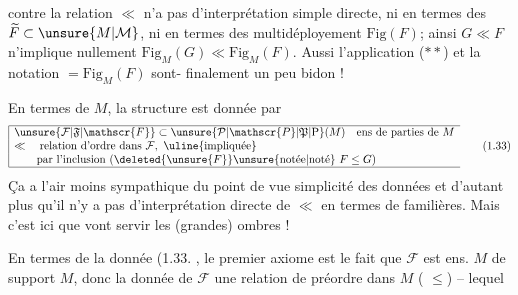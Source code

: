  contre la relation $\ll$ n'a pas d'interprétation simple directe, ni en termes des  $\widetilde F\subset\unsure{M|\mathcal{M}}$, ni en termes des multidéployement $\mathrm{Fig}(F)$; ainsi $G\ll F$ n'implique nullement $\mathrm{Fig}_{M}(G)\ll\mathrm{Fig}_{M}(F)$. Aussi l'application ($**$) et la notation $=\mathrm{Fig}_{M}(F)$ sont- finalement un peu bidon !

En termes de $M$, la structure est donnée par
\[
\begin{array}{|l}\hline
\unsure{\mathcal{F}|\mathfrak{F}|\mathscr{F}}\subset\unsure{\mathcal{P}|\mathscr{P}|\mathfrak{P}|\mathrm{P}}(M)\quad\text{ens de parties de }M\\
\ll\quad\text{relation d'ordre dans }\mathcal{F},\ \text{\uline{impliquée}}\\
\qquad\text{par l'inclusion }(\deleted{\unsure{F}}\text{\unsure{notée|noté} }F\leq G)
\\\hline\end{array}
\tag*{(1.33)}
\]
Ça a l'air moins sympathique du point de vue simplicité des données et d'autant plus qu'il n'y a pas  d'interprétation directe de $\ll$ en termes de   familières. Mais c'est ici que vont servir les (grandes) ombres !

En termes de la  donnée (1.33.\unsure{)|]} , le  premier axiome est  le fait que $\mathcal{F}$ est  ens.   $M$ de   support $M$,  donc la donnée de  $\mathcal{F}$   une relation de préordre dans $M$ ( $\leq$) -- lequel 
